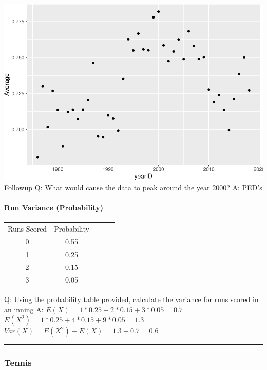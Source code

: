 \documentclass[]{article}
\let\oldparagraph\paragraph
\renewcommand{\paragraph}[1]{\oldparagraph{#1}\mbox{}}
\begin{document}
\includegraphics{22-isaac_files/figure-latex/unnamed-chunk-4-1.pdf}
Followup Q: What would cause the data to peak around the year 2000? A:
PED's

\hypertarget{run-variance-probability}{%
\paragraph{Run Variance (Probability)}\label{run-variance-probability}}

\begin{center}
\begin{tabular}{ c c c c c }
 Runs Scored & Probability \\ 
 0 & 0.55 \\  
 1 & 0.25 \\
 2 & 0.15 \\
 3 & 0.05
\end{tabular}
\end{center}

Q: Using the probability table provided, calculate the variance for runs
scored in an inning A: \(E(X)=1*0.25+2*0.15+3*0.05=0.7\)\\
\(E(X^2)=1*0.25+4*0.15+9*0.05=1.3\)\\
\(Var(X)=E(X^2)-E(X)=1.3-0.7=0.6\)

\begin{center}\rule{0.5\linewidth}{\linethickness}\end{center}

\hypertarget{tennis}{%
\subsubsection{Tennis}\label{tennis}}
\end{document}
